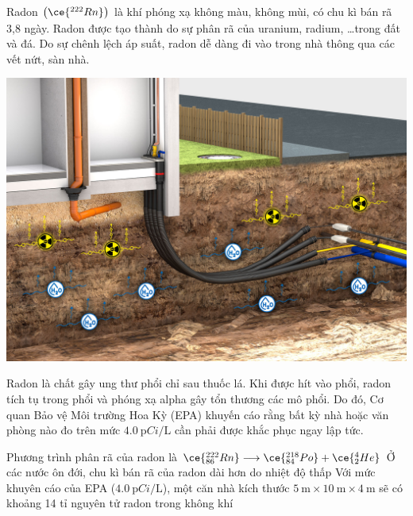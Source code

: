 \begin{ex}
	Radon $\left(\ce{^{222}Rn}\right)$ là khí phóng xạ không màu, không mùi, có chu kì bán rã 3,8 ngày. Radon được tạo thành do sự phân rã của uranium, radium, \dots trong đất và đá. Do sự chênh lệch áp suất, radon dễ dàng đi vào trong nhà thông qua các vết nứt, sàn nhà. 
	\begin{center}
		\includegraphics[width=0.4\linewidth]{../figs/VN12-Y24-PH-SYL-032P-2}
	\end{center}
	Radon là chất gây ung thư phổi chỉ sau thuốc lá. Khi được hít vào phổi, radon tích tụ trong phổi và phóng xạ alpha gây tổn thương các mô phổi. Do đó, Cơ quan Bảo vệ Môi trường Hoa Kỳ (EPA) khuyến cáo rằng bất kỳ nhà hoặc văn phòng nào đo trên mức $\SI{4.0}{\pico Ci/\liter}$ cần phải được khắc phục ngay lập tức.
	
	{\True Phương trình phân rã của radon là $\ce{^{222}_{86}Rn}\longrightarrow \ce{^{218}_{84}Po}+\ce{^4_2He}$}
	{Ở các nước ôn đới, chu kì bán rã của radon dài hơn do nhiệt độ thấp}
	{\True Với mức khuyên cáo của EPA ($\SI{4.0}{\pico Ci/\liter}$), một căn nhà kích thước $\SI{5}{\meter}\times \SI{10}{\meter}\times \SI{4}{\meter}$ sẽ có khoảng 14 tỉ nguyên tử radon trong không khí}
\end{ex}
